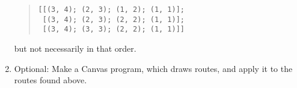 \begin{enumerate}
\begin{quote}
  \lstinline{[[(3, 4); (2, 3); (1, 2); (1, 1)];}\\
  \lstinline{ [(3, 4); (2, 3); (2, 2); (1, 1)];}\\
  \lstinline{ [(3, 4); (3, 3); (2, 2); (1, 1)]]}
\end{quote}
but not necessarily in that order.
\item Optional: Make a Canvas program, which draws routes, and apply it to the routes found above.
\end{enumerate}
